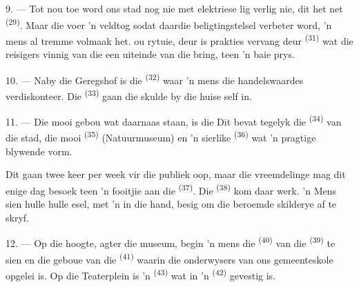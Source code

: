 \VUsaut{4.0mm}
\VUsaut{3.4mm}

9. --- Tot nou toe word ons stad nog nie met elektriese lig verlig nie, dit het net
 \textsuperscript{(29)}. Maar die  voer 'n veldtog
sodat daardie beligtingstelsel verbeter word,  'n mens al  tremme volmaak het.  ou rytuie,  deur
 is prakties vervang deur 
\textsuperscript{(31)} wat die reisigers vinnig van die een uiteinde van die  bring, teen 'n baie  prys.

10. --- Naby die Geregshof is die  \textsuperscript{(32)} waar 'n mens die
handelswaardes verdiskonteer. Die  \textsuperscript{(33)} gaan die
skulde by die huise self in.

\VUsaut{4.0mm}
\VUsaut{3.4mm}

11. --- Die mooi gebou wat daarnaas staan, is die  Dit bevat tegelyk die
 \textsuperscript{(34)} van die stad, die mooi
 \textsuperscript{(35)} (Natuurmuseum) en 'n
sierlike  \textsuperscript{(36)} wat 'n pragtige blywende
 vorm.

Dit gaan twee keer per week vir die publiek oop, maar die vreemdelinge mag dit enige dag
besoek teen 'n fooitjie aan die  \textsuperscript{(37)}. Die
 \textsuperscript{(38)} kom daar werk. 'n Mens sien hulle 
hulle esel, met 'n  in die hand, besig om die beroemde skilderye af te
skryf.

12. --- Op die hoogte, agter die museum, begin 'n mens die 
\textsuperscript{(40)} van die  \textsuperscript{(39)} te sien en die
geboue van die  \textsuperscript{(41)} waarin die onderwysers van
ons gemeenteskole opgelei is. Op die Teaterplein is 'n 
\textsuperscript{(43)} wat in 'n  \textsuperscript{(42)} gevestig is.

\VUsaut{5.0mm}
\VUsaut{3.0mm}

\VUsaut{3.4mm}

